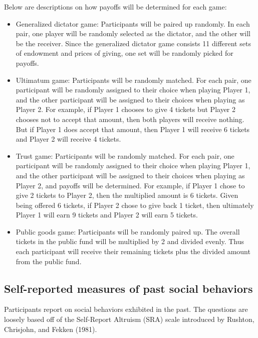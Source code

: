 \documentclass{article}
\begin{document}
Below are descriptions on how payoffs will be determined for each game: 

\begin{itemize}

\item Generalized dictator game: Participants will be paired up randomly. In each pair, one player will be randomly selected as the dictator, and the other will be the receiver.  Since the generalized dictator game consists 11 different sets of endowment and prices of giving, one set will be randomly picked for payoffs.

\item Ultimatum game: Participants will be randomly matched. For each pair, one participant will be randomly assigned to their choice when playing Player 1, and the other participant will be assigned to their choices when playing as Player 2. For example, if Player 1 chooses to give 4 tickets but Player 2 chooses not to accept that amount, then both players will receive nothing. But if Player 1 does accept that amount, then Player 1 will receive 6 tickets and Player 2 will receive 4 tickets.

\item Trust game: Participants will be randomly matched. For each pair, one participant will be randomly assigned to their choice when playing Player 1, and the other participant will be assigned to their choices when playing as Player 2, and payoffs will be determined. For example, if Player 1 chose to give 2 tickets to Player 2, then the multiplied amount is 6 tickets. Given being offered 6 tickets, if Player 2 chose to give back 1 ticket, then ultimately Player 1 will earn 9 tickets and Player 2 will earn 5 tickets.

\item Public goods game: Participants will be randomly paired up. The overall tickets in the public fund will be multiplied by 2 and divided evenly. Thus each participant will receive their remaining tickets plus the divided amount from the public fund.

\end{itemize}

\subsection{Self-reported measures of past social behaviors}

Participants report on social behaviors exhibited in the past. The questions are loosely based off of the Self-Report Altruism (SRA) scale introduced by Rushton, Chrisjohn, and Fekken (1981). 
\end{document}
